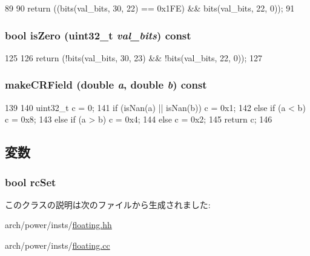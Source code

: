 \begin{DoxyCode}
89     {
90         return ((bits(val_bits, 30, 22) == 0x1FE) && bits(val_bits, 22, 0));
91     }
\end{DoxyCode}
\hypertarget{classPowerISA_1_1FloatOp_afd82689855b7421dec097b83f2d889c3}{
\subsubsection[{isZero}]{\setlength{\rightskip}{0pt plus 5cm}bool isZero ({\bf uint32\_\-t} {\em val\_\-bits}) const}}
\label{classPowerISA_1_1FloatOp_afd82689855b7421dec097b83f2d889c3}



\begin{DoxyCode}
125     {
126         return (!bits(val_bits, 30, 23) && !bits(val_bits, 22, 0));
127     }
\end{DoxyCode}
\hypertarget{classPowerISA_1_1FloatOp_ad27ebce7088c3abe70cd7fae2ffd2008}{
\subsubsection[{makeCRField}]{ makeCRField (double {\em a}, \/  double {\em b}) const}}
\label{classPowerISA_1_1FloatOp_ad27ebce7088c3abe70cd7fae2ffd2008}



\begin{DoxyCode}
139     {
140         uint32_t c = 0;
141         if (isNan(a) || isNan(b)) { c = 0x1; }
142         else if (a < b)           { c = 0x8; }
143         else if (a > b)           { c = 0x4; }
144         else                      { c = 0x2; }
145         return c;
146     }
\end{DoxyCode}


\subsection{変数}
\hypertarget{classPowerISA_1_1FloatOp_abfffe0b446d6f9419bdf9e72c73741fc}{
\subsubsection[{rcSet}]{\setlength{\rightskip}{0pt plus 5cm}bool {\bf rcSet}}}
\label{classPowerISA_1_1FloatOp_abfffe0b446d6f9419bdf9e72c73741fc}


このクラスの説明は次のファイルから生成されました:\begin{DoxyCompactItemize}
\item 
arch/power/insts/\hyperlink{floating_8hh}{floating.hh}\item 
arch/power/insts/\hyperlink{floating_8cc}{floating.cc}\end{DoxyCompactItemize}
